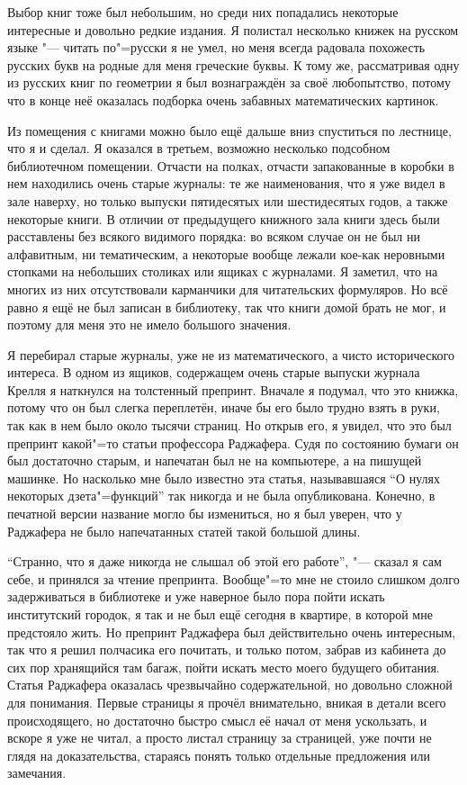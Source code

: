 Выбор книг тоже был небольшим, но среди них попадались некоторые интересные и
довольно редкие издания.
Я полистал несколько книжек на русском языке "--- читать по"=русски я не умел,
но меня всегда радовала похожесть русских букв на родные для меня греческие
буквы.
К тому же, рассматривая одну из русских книг по геометрии я был вознаграждён за
своё любопытство, потому что в конце неё оказалась подборка очень забавных
математических картинок.

Из помещения с книгами можно было ещё дальше вниз спуститься по лестнице, что я
и сделал.
Я оказался в третьем, возможно несколько подсобном библиотечном помещении.
Отчасти на полках, отчасти запакованные в коробки в нем находились очень старые
журналы:
те же наименования, что я уже видел в зале наверху, но только выпуски
пятидесятых или шестидесятых годов, а также некоторые книги.
В отличии от предыдущего книжного зала книги здесь были расставлены без всякого
видимого порядка: во всяком случае он не был ни алфавитным, ни тематическим, а
некоторые вообще лежали кое-как неровными стопками на небольших столиках или
ящиках с журналами.
Я заметил, что на многих из них отсутствовали карманчики для читательских
формуляров.
Но всё равно я ещё не был записан в библиотеку, так что книги домой брать не мог,
и поэтому для меня это не имело большого значения.

Я перебирал старые журналы, уже не из математического, а чисто исторического
интереса.
В одном из ящиков, содержащем очень старые выпуски журнала Крелля я наткнулся на
толстенный препринт.
Вначале я подумал, что это книжка, потому что он был слегка переплетён, иначе бы
его было трудно взять в руки, так как в нем было около тысячи страниц.
Но открыв его, я увидел, что это был препринт какой"=то статьи профессора
Раджафера.
Судя по состоянию бумаги он был достаточно старым, и напечатан был не на
компьютере, а на пишущей машинке.
Но насколько мне было известно эта статья, называвшаяся \enquote{О нулях
некоторых дзета"=функций} так никогда и не была опубликована.
Конечно, в печатной версии название могло бы измениться, но я был уверен, что у
Раджафера не было напечатанных статей такой большой длины.

\enquote{Странно, что я даже никогда не слышал об этой его работе}, "--- сказал
я сам себе, и принялся за чтение препринта. Вообще"=то мне не стоило
слишком долго задерживаться в библиотеке и уже наверное было пора
пойти искать институтский городок, я так и не был ещё сегодня в
квартире, в которой мне предстояло жить. Но препринт Раджафера был
действительно очень интересным, так что я решил полчасика его почитать,
и только потом, забрав из кабинета до сих пор хранящийся там багаж,
пойти искать место моего будущего обитания.
Статья Раджафера оказалась чрезвычайно содержательной, но
довольно сложной для понимания. Первые страницы я прочёл внимательно,
вникая в детали всего происходящего, но достаточно быстро смысл её начал
от меня ускользать, и вскоре я уже не читал, а просто листал страницу за
страницей, уже почти не глядя на доказательства, стараясь понять только
отдельные предложения или замечания.

